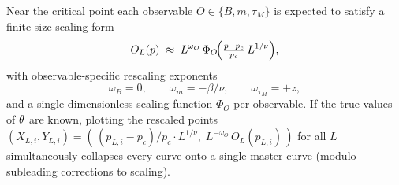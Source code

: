 \documentclass[pra,aps,twocolumn,groupedaddress,superscriptaddress,nofootinbib,preprintnumbers]{revtex4-2}
\begin{document}
\begin{widetext}
		\label{sec:hh-cost}
		
		Near the critical point each observable $ O \in \{B,m,\tau_M\}$ is expected to satisfy a
		finite-size scaling form
		\begin{equation}
			O_L(p) \;\approx\; L^{\omega_O}\,
			\Phi_O\!\Bigl(\tfrac{p - p_c}{p_c}\,L^{1/\nu}\Bigr),
			\label{eq:fss-ansatz}
		\end{equation}
		with observable-specific rescaling exponents
		\begin{equation}
			\omega_B = 0,\qquad
			\omega_{m} = -\beta/\nu,\qquad
			\omega_{\tau_M} = +z,
		\end{equation}
		and a single dimensionless scaling function $\Phi_O$ per observable.
		If the true values of $\theta$ are known, plotting the
		rescaled points $(X_{L,i}, Y_{L,i}) = (\,(p_{L,i} - p_c)/p_c \cdot
		L^{1/\nu},\; L^{-\omega_O}\,O_L(p_{L,i})\,)$ for all $L$ simultaneously
		collapses every curve onto a single master curve (modulo subleading corrections to scaling).
		

\end{widetext}
\end{document}
